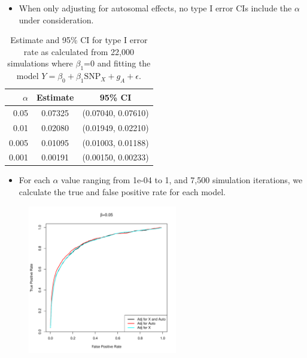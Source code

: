 \documentclass{beamer}
\begin{document}
\begin{frame}%
\begin{itemize}
\item When only adjusting for autosomal effects, no type I error CIs include the $\alpha$ under consideration.
\end{itemize}
\begin{table}[ht]
\centering
\begin{tabular}{r|cc}
  \hline
  $\alpha$ & Estimate & 95\% CI \\ 
  \hline
 0.05 & 0.07325 & (0.07040, 0.07610) \\ 
 0.01 & 0.02080 & (0.01949,  0.02210) \\ 
 0.005 & 0.01095 & (0.01003,  0.01188) \\ 
 0.001 & 0.00191 & (0.00150,  0.00233) \\ 
   \hline
\end{tabular}
\caption{Estimate and 95\% CI for type I error rate as calculated from 22,000 simulations where $\beta_1$=0 and fitting the model $Y = \beta_0 + \beta_1 \mbox{SNP}_X + g_A + \epsilon$.}
\end{table}
\end{frame}

\begin{frame}
\begin{itemize}
\item For each $\alpha$ value ranging from 1e-04 to 1, and 7,500 simulation iterations, we calculate the 
true and false positive rate for each model.
\end{itemize}
\begin{figure}
\includegraphics[height=6.5cm]{../power_3models_beta05.pdf}
\end{figure}
\end{frame}
\end{document}
